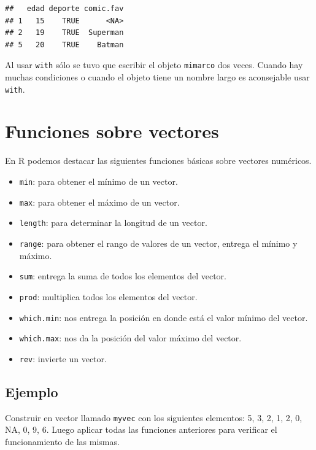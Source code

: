 \documentclass[10pt,]{krantz}
\providecommand{\tightlist}{%
  \setlength{\itemsep}{0pt}\setlength{\parskip}{0pt}}
\let\proglang=\textsf
\begin{document}
\begin{verbatim}
##   edad deporte comic.fav
## 1   15    TRUE      <NA>
## 2   19    TRUE  Superman
## 5   20    TRUE    Batman
\end{verbatim}

Al usar \texttt{with} sólo se tuvo que escribir el objeto
\texttt{mimarco} dos veces. Cuando hay muchas condiciones o cuando el
objeto tiene un nombre largo es aconsejable usar \texttt{with}.

\section{Funciones sobre vectores}\label{funciones-sobre-vectores}

En \proglang{R} podemos destacar las siguientes funciones básicas sobre
vectores numéricos.

    
  

\begin{itemize}
\tightlist
\item
  \texttt{min}: para obtener el mínimo de un vector.
\item
  \texttt{max}: para obtener el máximo de un vector.
\item
  \texttt{length}: para determinar la longitud de un vector.
\item
  \texttt{range}: para obtener el rango de valores de un vector, entrega
  el mínimo y máximo.
\item
  \texttt{sum}: entrega la suma de todos los elementos del vector.
\item
  \texttt{prod}: multiplica todos los elementos del vector.
\item
  \texttt{which.min}: nos entrega la posición en donde está el valor
  mínimo del vector.
\item
  \texttt{which.max}: nos da la posición del valor máximo del vector.
\item
  \texttt{rev}: invierte un vector.
\end{itemize}

\subsection*{Ejemplo}\label{ejemplo-9}


Construir en vector llamado \texttt{myvec} con los siguientes elementos:
5, 3, 2, 1, 2, 0, NA, 0, 9, 6. Luego aplicar todas las funciones
anteriores para verificar el funcionamiento de las mismas.
\end{document}
